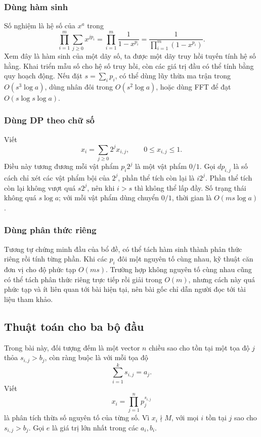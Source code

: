 \documentclass[11pt]{article}
\begin{document}
\subsubsection{Dùng hàm sinh}

Số nghiệm là hệ số của \(x^a\) trong
\[
  \prod_{i=1}^{m}\sum_{j\ge 0}x^{jp_i}
  =\prod_{i=1}^{m}\frac{1}{1-x^{p_i}}
  =\frac{1}{\prod_{i=1}^{m}(1-x^{p_i})}.
\]
Xem đây là hàm sinh của một dãy số, ta được một dãy truy hồi tuyến tính hệ số
hằng. Khai triển mẫu số cho hệ số truy hồi, còn các giá trị đầu có thể tính
bằng quy hoạch động. Nếu đặt \(s=\sum_i p_i\), có thể dùng lũy thừa ma trận
trong \(O(s^3\log a)\), dùng nhân đôi trong \(O(s^2\log a)\), hoặc dùng FFT để
đạt \(O(s\log s\log a)\).

\subsubsection{Dùng DP theo chữ số}

Viết
\[
  x_i=\sum_{j\ge 0}2^j x_{i,j},\qquad 0\le x_{i,j}\le 1.
\]
Điều này tương đương mỗi vật phẩm \(p_i2^j\) là một vật phẩm \(0/1\). Gọi
\(dp_{i,j}\) là số cách chỉ xét các vật phẩm bội của \(2^j\), phần thể tích còn
lại là \(i2^j\). Phần thể tích còn lại không vượt quá \(s2^j\), nên khi
\(i>s\) thì không thể lấp đầy. Số trạng thái không quá \(s\log a\); với mỗi
vật phẩm dùng chuyển \(0/1\), thời gian là \(O(ms\log a)\).

\subsubsection{Dùng phân thức riêng}

Tương tự chứng minh đầu của bổ đề, có thể tách hàm sinh thành phân thức riêng
rồi tính từng phần. Khi các \(p_i\) đôi một nguyên tố cùng nhau, kỹ thuật căn
đơn vị cho độ phức tạp \(O(ms)\). Trường hợp không nguyên tố cùng nhau cũng có
thể tách phân thức riêng trực tiếp rồi giải trong \(O(m)\), nhưng cách này quá
phức tạp và ít liên quan tới bài hiện tại, nên bài gốc chỉ dẫn người đọc tới
tài liệu tham khảo.

\subsection{Thuật toán cho ba bộ đầu}

Trong bài này, đối tượng đếm là một vector \(n\) chiều sao cho tồn tại một
tọa độ \(j\) thỏa \(s_{i,j}>b_j\), còn ràng buộc là với mỗi tọa độ
\[
  \sum_{i=1}^{k}s_{i,j}=a_j.
\]
Viết
\[
  x_i=\prod_{j=1}^{n}p_j^{s_{i,j}}
\]
là phân tích thừa số nguyên tố của từng số. Vì \(x_i\nmid M\), với mọi \(i\)
tồn tại \(j\) sao cho \(s_{i,j}>b_j\). Gọi \(e\) là giá trị lớn nhất trong các
\(a_i,b_i\).
\end{document}
